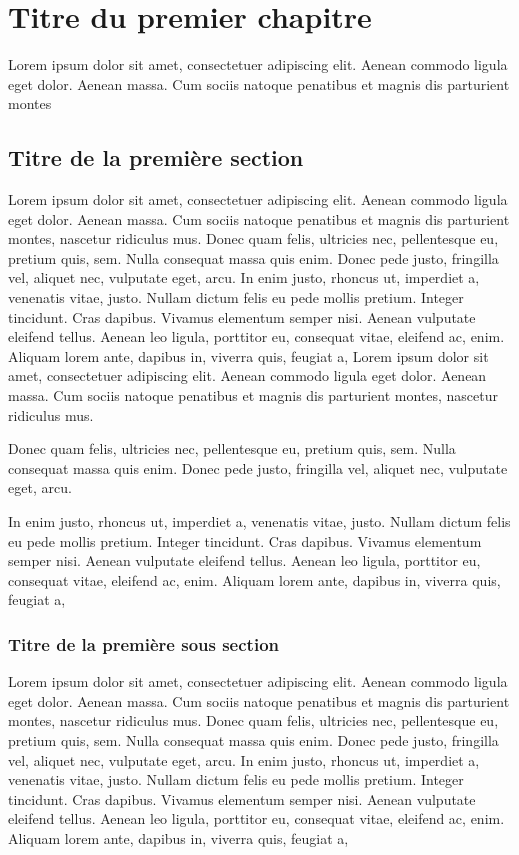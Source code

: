 \documentclass[a4paper,12 pt,twoside]{report}
\begin{document}
\chapter {Titre du premier chapitre}
\thispagestyle {empty}
Lorem ipsum dolor sit amet, consectetuer
adipiscing elit. Aenean commodo ligula eget dolor. Aenean massa. Cum
sociis natoque penatibus et magnis dis parturient montes

\section {Titre de la première section}

Lorem ipsum dolor sit amet, consectetuer adipiscing elit. Aenean
commodo ligula eget dolor. Aenean massa. Cum sociis natoque
penatibus et magnis dis parturient montes, nascetur ridiculus mus.
Donec quam felis, ultricies nec, pellentesque eu, pretium quis, sem.
Nulla consequat massa quis enim. Donec pede justo, fringilla vel,
aliquet nec, vulputate eget, arcu. In enim justo, rhoncus ut,
imperdiet a, venenatis vitae, justo. Nullam dictum felis eu pede
mollis pretium. Integer tincidunt. Cras dapibus. Vivamus elementum
semper nisi. Aenean vulputate eleifend tellus. Aenean leo ligula,
porttitor eu, consequat vitae, eleifend ac, enim. Aliquam lorem
ante, dapibus in, viverra quis, feugiat a, Lorem ipsum dolor sit
amet, consectetuer adipiscing elit. Aenean commodo ligula eget
dolor. Aenean massa. Cum sociis natoque penatibus et magnis dis
parturient montes, nascetur ridiculus mus.

Donec quam felis, ultricies nec, pellentesque eu, pretium quis, sem.
Nulla consequat massa quis enim. Donec pede justo, fringilla vel,
aliquet nec, vulputate eget, arcu.

In enim justo, rhoncus ut, imperdiet a, venenatis vitae, justo.
Nullam dictum felis eu pede mollis pretium. Integer tincidunt. Cras
dapibus. Vivamus elementum semper nisi. Aenean vulputate eleifend
tellus. Aenean leo ligula, porttitor eu, consequat vitae, eleifend
ac, enim. Aliquam lorem ante, dapibus in, viverra quis, feugiat a,

\subsection {Titre de la première sous section}

Lorem ipsum dolor sit amet, consectetuer adipiscing elit. Aenean
commodo ligula eget dolor. Aenean massa. Cum sociis natoque
penatibus et magnis dis parturient montes, nascetur ridiculus mus.
Donec quam felis, ultricies nec, pellentesque eu, pretium quis, sem.
Nulla consequat massa quis enim. Donec pede justo, fringilla vel,
aliquet nec, vulputate eget, arcu. In enim justo, rhoncus ut,
imperdiet a, venenatis vitae, justo. Nullam dictum felis eu pede
mollis pretium. Integer tincidunt. Cras dapibus. Vivamus elementum
semper nisi. Aenean vulputate eleifend tellus. Aenean leo ligula,
porttitor eu, consequat vitae, eleifend ac, enim. Aliquam lorem
ante, dapibus in, viverra quis, feugiat a,
\end{document}
